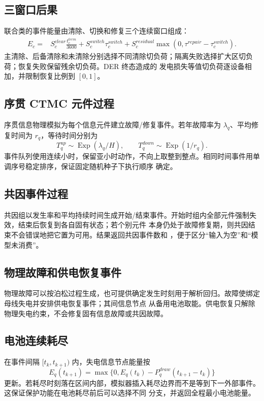 \subsection{三窗口后果}
联合类的事件能量由清除、切换和修复三个连续窗口组成：
\begin{align}
 E_c={}&S_c^{clear}\frac{t_c^{term}}{3600}
 +S_c^{switch}\tau_c^{switch}
 +S_c^{residual}\max(0,\tau^{repair}-\tau_c^{switch}).
\end{align}
主清除、后备清除和未清除分别选择不同清除切负荷；隔离失败选择扩大区切负荷；恢复失败保留残余切负荷。DER 终态造成的
发电损失等值切负荷逐设备相加，并限制恢复比例到 $[0,1]$。

\subsection{序贯 CTMC 元件过程}
序贯信息物理模拟为每个信息元件建立故障/修复事件。若年故障率为 $\lambda_q$、平均修复时间为 $r_q$，等待时间分别为
\begin{equation}
 T_q^{up}\sim\operatorname{Exp}(\lambda_q/H),\qquad
 T_q^{down}\sim\operatorname{Exp}(1/r_q).
\end{equation}
事件队列使用连续小时，保留亚小时动作，不向上取整到整点。相同时间事件用单调序号稳定排序，保证固定随机种子下执行顺序
确定。

\subsection{共因事件过程}
共因组以发生率和平均持续时间生成开始/结束事件。开始时组内全部元件强制失效，结束后恢复到各自固有状态；若个别元件
本身仍处于故障修复期，则共因结束不会错误地把它置为可用。结果返回共因事件数和
，便于区分“输入为空”和“模型未消费”。

\subsection{物理故障和供电恢复事件}
物理故障可以按泊松过程生成，也可提供确定发生时刻用于解析回归。故障使绑定母线失电并安排供电恢复事件；其间信息节点
从备用电池取能。供电恢复只解除物理失电约束，不会修复固有信息故障或共因故障。

\subsection{电池连续耗尽}
在事件间隔 $[t_k,t_{k+1})$ 内，失电信息节点能量按
\begin{equation}
 E_q(t_{k+1})=\max\{0,E_q(t_k)-P_q^{draw}(t_{k+1}-t_k)\}
\end{equation}
更新。若耗尽时刻落在区间内部，模拟器插入耗尽边界而不是等到下一外部事件。这保证保护功能在电池耗尽前后可以选择不同
分支，并返回全程最小电池能量。

